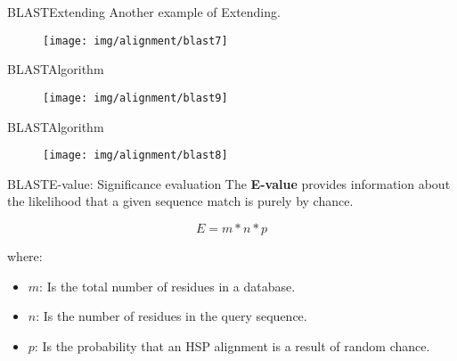 \documentclass[10pt]{beamer}
\newcommand{\1}{
	\setbeamertemplate{background}{
		\texttt{[image: img/1]}
		\tikz[overlay] \fill[fill opacity=0.75,fill=white] (0,0) rectangle (-\paperwidth,\paperheight);
	}
}
\begin{document}
\begin{frame}{BLAST}{Extending}
	Another example of Extending.
	\begin{figure}[]
		\centering
		\texttt{[image: img/alignment/blast7]}
	\end{figure}
\end{frame}

\begin{frame}{BLAST}{Algorithm}
	
	\begin{figure}[]
		\centering
		\texttt{[image: img/alignment/blast9]}
	\end{figure}
\end{frame}

\begin{frame}{BLAST}{Algorithm}

	\begin{figure}[]
		\centering
		\texttt{[image: img/alignment/blast8]}
	\end{figure}
\end{frame}

\begin{frame}{BLAST}{E-value: Significance evaluation}
The \textbf{E-value} provides information about the likelihood that a given sequence match
is purely by chance.
\begin{block}{}
	\[
	E = m*n*p
	\]
\end{block}
where:
\begin{itemize}
	\item $m$: Is the total number of residues in a database.
	\item $n$: Is the number of residues in the query sequence.
	\item $p$: Is the probability that an HSP alignment is a result of
	random chance.

\end{itemize}


\end{frame}
\end{document}
